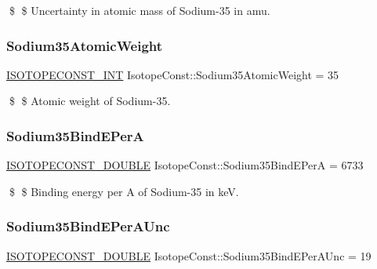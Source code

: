 \$ \$ Uncertainty in atomic mass of Sodium-\/35 in amu. \mbox{\label{group___isotope_const-_sodium-_na35_gaba2168b272a9ed5a5b7ec704911ee271}} 
\subsubsection{\texorpdfstring{Sodium35\+Atomic\+Weight}{Sodium35AtomicWeight}}
{\footnotesize\ttfamily \mbox{\hyperlink{group___isotope_const-_macros_ga5f18360b3e99483a35c32d789e62621c}{I\+S\+O\+T\+O\+P\+E\+C\+O\+N\+S\+T\+\_\+\+I\+NT}} Isotope\+Const\+::\+Sodium35\+Atomic\+Weight = 35}

\$ \$ Atomic weight of Sodium-\/35. \mbox{\label{group___isotope_const-_sodium-_na35_gac50ceb0d04ff27ae4697bc8d1dd89e06}} 
\subsubsection{\texorpdfstring{Sodium35\+Bind\+E\+PerA}{Sodium35BindEPerA}}
{\footnotesize\ttfamily \mbox{\hyperlink{group___isotope_const-_macros_ga8f45a7272ce02c0b4c65c44636ed719a}{I\+S\+O\+T\+O\+P\+E\+C\+O\+N\+S\+T\+\_\+\+D\+O\+U\+B\+LE}} Isotope\+Const\+::\+Sodium35\+Bind\+E\+PerA = 6733}

\$ \$ Binding energy per A of Sodium-\/35 in keV. \mbox{\label{group___isotope_const-_sodium-_na35_ga4db2e77be73125238b109f2a10fff90e}} 
\subsubsection{\texorpdfstring{Sodium35\+Bind\+E\+Per\+A\+Unc}{Sodium35BindEPerAUnc}}
{\footnotesize\ttfamily \mbox{\hyperlink{group___isotope_const-_macros_ga8f45a7272ce02c0b4c65c44636ed719a}{I\+S\+O\+T\+O\+P\+E\+C\+O\+N\+S\+T\+\_\+\+D\+O\+U\+B\+LE}} Isotope\+Const\+::\+Sodium35\+Bind\+E\+Per\+A\+Unc = 19}

